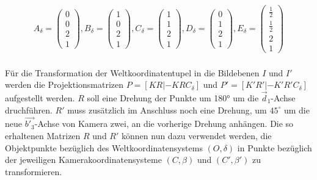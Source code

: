 \begin{gather}
	A_\delta=\begin{pmatrix}
		0\\0\\2\\1
	\end{pmatrix}, 
	B_\delta=
	\begin{pmatrix}
		1\\0\\2\\1
	\end{pmatrix},
	C_\delta=
	\begin{pmatrix}
		1\\1\\2\\1
	\end{pmatrix},
	D_\delta=
	\begin{pmatrix}
		0\\1\\2\\1
	\end{pmatrix},
	E_\delta=
	\begin{pmatrix}
		\frac{1}{2}\\\frac{1}{2}\\2\\1
	\end{pmatrix}
\end{gather}\\

Für die Transformation der Weltkoordinatentupel in die Bildebenen $I$ und $I'$ werden die Projektionsmatrizen $P=[KR|-KRC_\delta]$ und $P'=[K'R'|-K'R'C_\delta]$ aufgestellt werden. \ensuremath{R} soll eine Drehung der Punkte um 180° um die \ensuremath{\vec{d}_1}-Achse druchführen. \ensuremath{R'} muss zusätzlich im Anschluss noch eine Drehung, um \ensuremath{45^\circ} um die neue $\vec{b'_3}$-Achse von Kamera zwei, an die vorherige Drehung anhängen. Die so erhaltenen Matrizen \ensuremath{R} und \ensuremath{R'} können nun dazu verwendet werden, die Objektpunkte bezüglich des Weltkoordinatensystems $(O,\delta)$ in Punkte bezüglich der jeweiligen Kamerakoordinatensysteme $(C,\beta)$ und $(C',\beta')$ zu transformieren.


